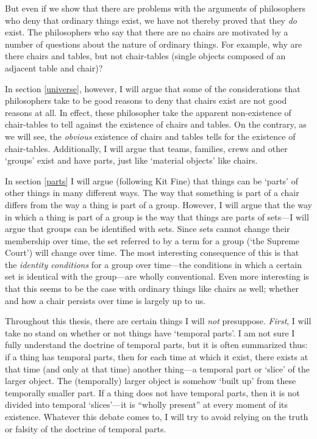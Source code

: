 \documentclass[11pt]{article}
\begin{document}
\begin{spacing}{1.5}
But even if we show that there are problems with the arguments of
philosophers who deny that ordinary things exist, we have not thereby
proved that they {\em do} exist.  The philosophers who say that there
are no chairs are motivated by a number of questions about the nature
of ordinary things.  For example, why are there chairs and tables, but
not chair-tables (single objects composed of an adjacent table and
chair)?

In section \ref{universe}, however, I will argue that some of the
considerations that philosophers take to be good reasons to deny that
chairs exist are not good reasons at all.  In effect, these
philosopher take the apparent non-existence of chair-tables to tell
against the existence of chairs and tables.  On the contrary, as we
will see, the {\em obvious} existence of chairs and tables tells for
the existence of chair-tables.  Additionally, I will argue that teams,
families, crews and other `groups' exist and have parts, just like
`material objects' like chairs.  

In section \ref{parts} I will argue (following Kit Fine) that things
can be `parts' of other things in many different ways.  The way that
something is part of a chair differs from the way a thing is part of a
group.  However, I will argue that the way in which a thing is part of
a group is the way that things are parts of sets---I will argue that
groups can be identified with sets.  Since sets cannot change their
membership over time, the set referred to by a term for a group (`the
Supreme Court') will change over time.  The most interesting
consequence of this is that the {\em identity conditions} for a group
over time---the conditions in which a certain set is identical with
the group---are wholly conventional.  Even more interesting is that
this seems to be the case with ordinary things like chairs as well;
whether and how a chair persists over time is largely up to us.

Throughout this thesis, there are certain things I will {\em not}
presuppose.  {\em First}, I will take no stand on whether or not
things have `temporal parts'.  I am not sure I fully understand the
doctrine of temporal parts, but it is often summarized thus: if a
thing has temporal parts, then for each time at which it exist, there
exists at that time (and only at that time) another thing---a temporal
part or `slice' of the larger object.  The (temporally) larger object
is somehow `built up' from these temporally smaller part.  If a thing
does not have temporal parts, then it is not divided into temporal
`slices'---it is ``wholly present'' at every moment of its existence.
Whatever this debate comes to, I will try to avoid relying on the
truth or falsity of the doctrine of temporal parts.


\end{spacing}
\end{document}
